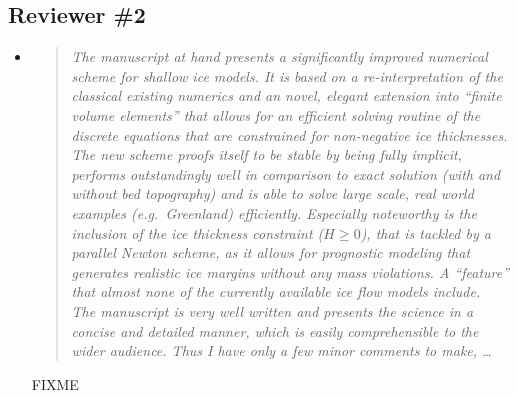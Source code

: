 \documentclass[11pt,reqno]{amsart}
\newcommand{\reply}[2]{
\medskip\medskip
\item  \begin{quote}
\emph{#1}
\end{quote}

\medskip
\noindent #2}
\begin{document}
\subsection*{Reviewer \#2}  \begin{itemize}
\reply{The manuscript at hand presents a significantly improved numerical scheme for shallow ice models. It is based on a re-interpretation of the classical existing numerics and an novel, elegant extension into ``finite volume elements'' that allows for an efficient solving routine of the discrete equations that are constrained for non-negative ice thicknesses. The new scheme proofs itself to be stable by being fully implicit, performs outstandingly well in comparison to exact solution (with and without bed topography) and is able to solve large scale, real world examples (e.g.~Greenland) efficiently. Especially noteworthy is the inclusion of the ice thickness constraint ($H\ge 0$), that is tackled by a parallel Newton scheme, as it allows for prognostic modeling that generates realistic ice margins without any mass violations.  A ``feature'' that almost none of the currently available ice flow models include. \medskip \\
The manuscript is very well written and presents the science in a concise and detailed manner, which is easily comprehensible to the wider audience. Thus I have only a few minor comments to make, \dots}
{FIXME}


\end{itemize}
\end{document}
